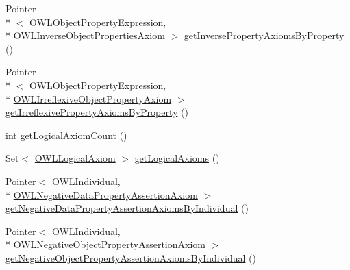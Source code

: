 \begin{DoxyCompactItemize}
\item 
Pointer\\*
$<$ \hyperlink{interfaceorg_1_1semanticweb_1_1owlapi_1_1model_1_1_o_w_l_object_property_expression}{O\-W\-L\-Object\-Property\-Expression}, \\*
\hyperlink{interfaceorg_1_1semanticweb_1_1owlapi_1_1model_1_1_o_w_l_inverse_object_properties_axiom}{O\-W\-L\-Inverse\-Object\-Properties\-Axiom} $>$ \hyperlink{interfaceuk_1_1ac_1_1manchester_1_1cs_1_1owl_1_1owlapi_1_1_internals_ae2dd2ac469b12fe2399e9f63e6d41456}{get\-Inverse\-Property\-Axioms\-By\-Property} ()
\item 
Pointer\\*
$<$ \hyperlink{interfaceorg_1_1semanticweb_1_1owlapi_1_1model_1_1_o_w_l_object_property_expression}{O\-W\-L\-Object\-Property\-Expression}, \\*
\hyperlink{interfaceorg_1_1semanticweb_1_1owlapi_1_1model_1_1_o_w_l_irreflexive_object_property_axiom}{O\-W\-L\-Irreflexive\-Object\-Property\-Axiom} $>$ \hyperlink{interfaceuk_1_1ac_1_1manchester_1_1cs_1_1owl_1_1owlapi_1_1_internals_a4385b8da38105f734e26d6ac0e148ecb}{get\-Irreflexive\-Property\-Axioms\-By\-Property} ()
\item 
int \hyperlink{interfaceuk_1_1ac_1_1manchester_1_1cs_1_1owl_1_1owlapi_1_1_internals_aae7deaa3e4e1d0f446c398c590a4d505}{get\-Logical\-Axiom\-Count} ()
\item 
Set$<$ \hyperlink{interfaceorg_1_1semanticweb_1_1owlapi_1_1model_1_1_o_w_l_logical_axiom}{O\-W\-L\-Logical\-Axiom} $>$ \hyperlink{interfaceuk_1_1ac_1_1manchester_1_1cs_1_1owl_1_1owlapi_1_1_internals_a206ab984f8d026b971a49df1308dc6b5}{get\-Logical\-Axioms} ()
\item 
Pointer$<$ \hyperlink{interfaceorg_1_1semanticweb_1_1owlapi_1_1model_1_1_o_w_l_individual}{O\-W\-L\-Individual}, \\*
\hyperlink{interfaceorg_1_1semanticweb_1_1owlapi_1_1model_1_1_o_w_l_negative_data_property_assertion_axiom}{O\-W\-L\-Negative\-Data\-Property\-Assertion\-Axiom} $>$ \hyperlink{interfaceuk_1_1ac_1_1manchester_1_1cs_1_1owl_1_1owlapi_1_1_internals_a9d65d2089858bc6556866267d4156530}{get\-Negative\-Data\-Property\-Assertion\-Axioms\-By\-Individual} ()
\item 
Pointer$<$ \hyperlink{interfaceorg_1_1semanticweb_1_1owlapi_1_1model_1_1_o_w_l_individual}{O\-W\-L\-Individual}, \\*
\hyperlink{interfaceorg_1_1semanticweb_1_1owlapi_1_1model_1_1_o_w_l_negative_object_property_assertion_axiom}{O\-W\-L\-Negative\-Object\-Property\-Assertion\-Axiom} $>$ \hyperlink{interfaceuk_1_1ac_1_1manchester_1_1cs_1_1owl_1_1owlapi_1_1_internals_a40b3894410d108d2aeb722ff52a5b3f5}{get\-Negative\-Object\-Property\-Assertion\-Axioms\-By\-Individual} ()

\end{DoxyCompactItemize}

